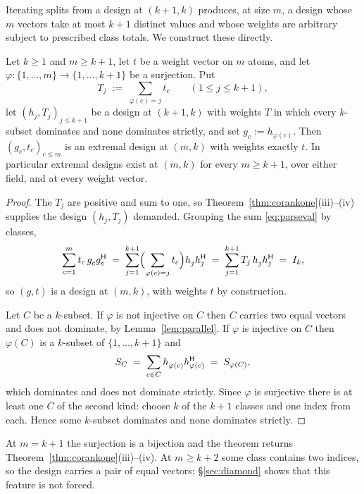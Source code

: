Iterating splits from a design at $(k+1,k)$ produces, at size $m$, a
design whose $m$ vectors take at most $k+1$ distinct values and whose
weights are arbitrary subject to prescribed class totals.  We construct
these directly.

\begin{theorem}[Lean]\label{thm:tieseverywhere}
Let $k\ge1$ and $m\ge k+1$, let $t$ be a weight vector on $m$ atoms, and
let $\varphi:\{1,\dots,m\}\to\{1,\dots,k+1\}$ be a surjection.  Put
\[
  T_j\;:=\;\sum_{\varphi(c)=j}t_c \qquad (1\le j\le k+1),
\]
let $(h_j,T_j)_{j\le k+1}$ be a design at $(k+1,k)$ with weights $T$ in
which every $k$-subset dominates and none dominates strictly, and set
$g_c:=h_{\varphi(c)}$.  Then $(g_c,t_c)_{c\le m}$ is an extremal design at
$(m,k)$ with weights exactly $t$.  In particular extremal designs exist at
$(m,k)$ for every $m\ge k+1$, over either field, and at every weight
vector.
\end{theorem}

\begin{proof}
The $T_j$ are positive and sum to one, so Theorem~\ref{thm:corankone}(iii)--(iv)
supplies the design $(h_j,T_j)$ demanded.  Grouping the sum
\eqref{eq:parseval} by classes,
\[
  \sum_{c=1}^{m}t_c\,g_c^{\vphantom{\mathsf{H}}}g_c\adj
  \;=\;\sum_{j=1}^{k+1}\Bigl(\sum_{\varphi(c)=j}t_c\Bigr)
        h_j^{\vphantom{\mathsf{H}}}h_j\adj
  \;=\;\sum_{j=1}^{k+1}T_j\,h_j^{\vphantom{\mathsf{H}}}h_j\adj\;=\;I_k,
\]
so $(g,t)$ is a design at $(m,k)$, with weights $t$ by construction.

Let $C$ be a $k$-subset.  If $\varphi$ is not injective on $C$ then $C$
carries two equal vectors and does not dominate, by
Lemma~\ref{lem:parallel}.  If $\varphi$ is injective on $C$ then
$\varphi(C)$ is a $k$-subset of $\{1,\dots,k+1\}$ and
\[
  \SC\;=\;\sum_{c\in C}h_{\varphi(c)}^{\vphantom{\mathsf{H}}}h_{\varphi(c)}\adj
      \;=\;S_{\varphi(C)},
\]
which dominates and does not dominate strictly.  Since $\varphi$ is
surjective there is at least one $C$ of the second kind: choose $k$ of the
$k+1$ classes and one index from each.  Hence some $k$-subset dominates
and none dominates strictly.
\end{proof}

At $m=k+1$ the surjection is a bijection and the theorem returns
Theorem~\ref{thm:corankone}(iii)--(iv).  At $m\ge k+2$ some class contains two indices,
so the design carries a pair of equal vectors; \S\ref{sec:diamond} shows
that this feature is not forced.

